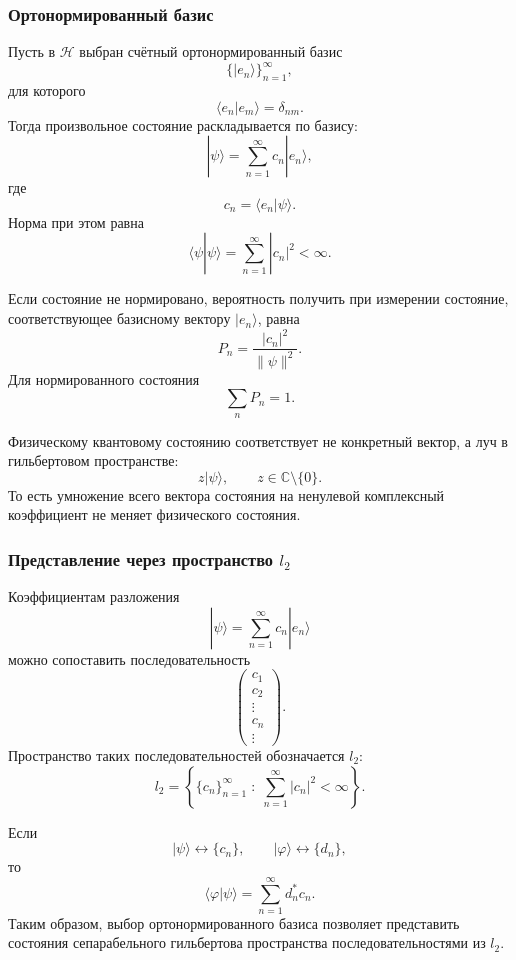 \documentclass[12pt,a4paper]{article}
\begin{document}
\subsubsection{Ортонормированный базис}

Пусть в $\mathcal H$ выбран счётный ортонормированный базис
\[
    \{|e_n\rangle\}_{n=1}^{\infty},
\]
для которого
\[
    \boxed{
        \langle e_n|e_m\rangle
        =
        \delta_{nm}
    }.
\]
Тогда произвольное состояние раскладывается по базису:
\[
    \boxed{
        |\psi\rangle
        =
        \sum_{n=1}^{\infty}
        c_n|e_n\rangle
    },
\]
где
\[
    \boxed{
        c_n=\langle e_n|\psi\rangle
    }.
\]
Норма при этом равна
\[
    \boxed{
        \langle\psi|\psi\rangle
        =
        \sum_{n=1}^{\infty}|c_n|^2
        <\infty
    }.
\]

Если состояние не нормировано, вероятность получить при измерении
состояние, соответствующее базисному вектору $|e_n\rangle$, равна
\[
    \boxed{
        P_n
        =
        \frac{|c_n|^2}{\|\psi\|^2}
    }.
\]
Для нормированного состояния
\[
    \sum_nP_n=1.
\]

Физическому квантовому состоянию соответствует не конкретный вектор,
а луч в гильбертовом пространстве:
\[
    \boxed{
        z|\psi\rangle,
        \qquad
        z\in\mathbb C\setminus\{0\}
    }.
\]
То есть умножение всего вектора состояния на ненулевой комплексный
коэффициент не меняет физического состояния.

\subsubsection{Представление через пространство \texorpdfstring{$l_2$}{l2}}

Коэффициентам разложения
\[
    |\psi\rangle
    =
    \sum_{n=1}^{\infty}c_n|e_n\rangle
\]
можно сопоставить последовательность
\[
    \begin{pmatrix}
        c_1\\
        c_2\\
        \vdots\\
        c_n\\
        \vdots
    \end{pmatrix}.
\]
Пространство таких последовательностей обозначается $l_2$:
\[
    \boxed{
    l_2
    =
    \left\{
        \{c_n\}_{n=1}^{\infty}
        \;:\;
        \sum_{n=1}^{\infty}|c_n|^2<\infty
    \right\}
    }.
\]

Если
\[
    |\psi\rangle\longleftrightarrow\{c_n\},
    \qquad
    |\varphi\rangle\longleftrightarrow\{d_n\},
\]
то
\[
    \boxed{
        \langle\varphi|\psi\rangle
        =
        \sum_{n=1}^{\infty}d_n^*c_n
    }.
\]
Таким образом, выбор ортонормированного базиса позволяет представить
состояния сепарабельного гильбертова пространства последовательностями
из $l_2$.
\end{document}
